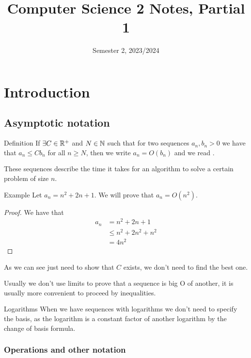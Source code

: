 \documentclass[12pt]{extarticle}
\title{Computer Science 2 Notes, Partial 1}
\date{Semester 2, 2023/2024}
\begin{document}
\maketitle
\tableofcontents
\clearpage

\section{Introduction}

\subsection{Asymptotic notation}

\begin{bluebox}{Definition}
    If $\exists C \in \mathbb{R}^+$ and $N \in \mathbb{N}$ such that for two sequences $a_n, b_n > 0$
    we have that $a_n \leq Cb_n$ for all $n \geq N$, then we write $a_n = O(b_n)$ and we read .
\end{bluebox}

These sequences describe the time it takes for an algorithm to solve a certain problem of size $n$.

\begin{examplebox}{Example}
    Let $a_n = n^2 + 2n + 1$. We will prove that $a_n = O(n^2)$.

    \begin{proof}
        We have that
        \begin{align*}
            a_n & = n^2 + 2n + 1        \\
                & \leq n^2 + 2n^2 + n^2 \\
                & = 4n^2
        \end{align*}
    \end{proof}

    As we can see just need to show that $C$ exists, we don't need to find the best one.
\end{examplebox}

Usually we don't use limits to prove that a sequence is big O of another, it is usually more convenient to proceed by inequalities.

\begin{notebox}{Logarithms}
    When we have sequences with logarithms we don't need to specify the basis,
    as the logarithm is a constant factor of another logarithm by the change of basis formula.
\end{notebox}

\subsubsection{Operations and other notation}
\end{document}
